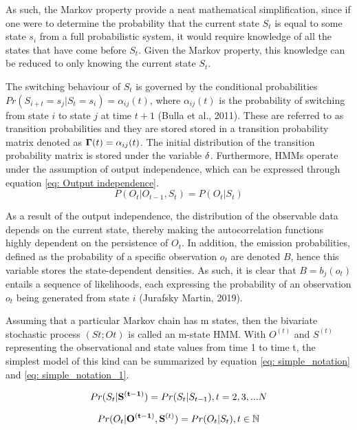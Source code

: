 As such, the Markov property provide a neat mathematical simplification, since if one were to determine the probability that the current state $S_t$ is equal to some state $s_i$ from a full probabilistic system, it would require knowledge of all the states that have come before $S_t$. Given the Markov property, this knowledge can be reduced to only knowing the current state $S_t$. 

The switching behaviour of $S_t$ is governed by the conditional probabilities $Pr(S_{i+t} = s_j| S_t = s_i) = \alpha_{ij}(t)$, where $\alpha_{ij}(t)$ is the probability of switching from state $i$ to state $j$ at time $t + 1$ (Bulla et al., 2011). These are referred to as transition probabilities and they are stored stored in a transition probability matrix denoted as $\bold{\Gamma}(t) = {\alpha_{ij}(t)}$. The initial distribution of the transition probability matrix is stored under the variable $\bold{\delta}$.  Furthermore, HMMs operate under the assumption of output independence, which can be expressed through equation \ref{eq: Output independence}.
\begin{equation}
    P(O_t|O_{t-1}, S_t) = P(O_t|S_t)
    \label{eq: Output independence}
\end{equation}

As a result of the output independence, the distribution of the observable data depends on the current state, thereby making the autocorrelation functions highly dependent on the persistence of $O_t$. In addition, the emission probabilities, defined as the probability of a specific observation $o_t$ are denoted $B$, hence this variable stores the state-dependent densities. As such, it is clear that $B = b_j(o_t)$ entails a sequence of likelihoods, each expressing the probability of an observation $o_t$ being generated from state $i$ (Jurafsky Martin, 2019).

Assuming that a particular Markov chain has m states, then the bivariate stochastic process
$(St;Ot)$ is called an m-state HMM. With $O^{(t)}$ and $S^{(t)}$ representing the observational and state values from time 1 to time t, the simplest model of this kind can be summarized by equation \ref{eq: simple_notation} and \ref{eq: simple_notation_1}.

\begin{equation}
    Pr(S_t | \bold{S^{(t-1)}}) = Pr(S_t | S_{t-1}),    t=2,3,...N
    \label{eq: simple_notation}
\end{equation} 

\begin{equation}
    Pr(O_t|\bold{O^{(t-1)}}, \bold{S}^{(t)}) = Pr(O_t|S_t), t \in \mathbb{N}
    \label{eq: simple_notation_1}
\end{equation}

